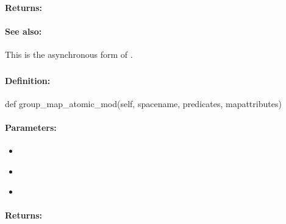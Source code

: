 \paragraph{Returns:}


\paragraph{See also:}  This is the asynchronous form of .

\pagebreak
\subsubsection{}
\label{api:python:group_map_atomic_mod}


\paragraph{Definition:}
\begin{pythoncode}
def group_map_atomic_mod(self, spacename, predicates, mapattributes)
\end{pythoncode}

\paragraph{Parameters:}
\begin{itemize}[noitemsep]
\item {}\\

\item {}\\

\item {}\\

\end{itemize}

\paragraph{Returns:}


